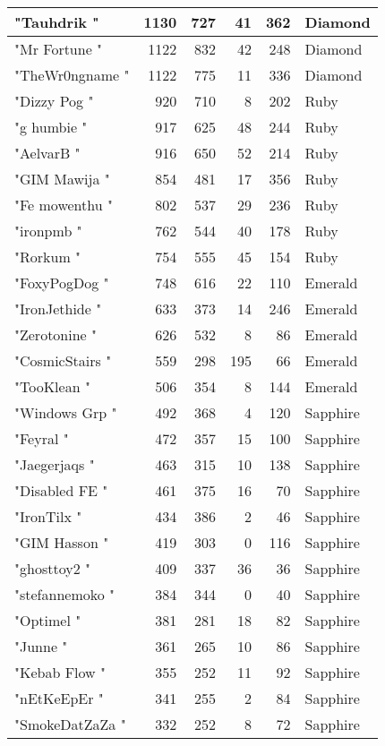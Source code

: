 \documentclass{article}
\begin{document}
\begin{table}[htbp]
\begin{tabular}{|l|r|r|r|r|l|}
"Tauhdrik " & 1130 & 727 & 41 & 362 & Diamond \\ \hline
"Mr Fortune " & 1122 & 832 & 42 & 248 & Diamond \\ \hline
"TheWr0ngname " & 1122 & 775 & 11 & 336 & Diamond \\ \hline
"Dizzy Pog " & 920 & 710 & 8 & 202 & Ruby \\ \hline
"g humbie " & 917 & 625 & 48 & 244 & Ruby \\ \hline
"AelvarB " & 916 & 650 & 52 & 214 & Ruby \\ \hline
"GIM Mawija " & 854 & 481 & 17 & 356 & Ruby \\ \hline
"Fe mowenthu " & 802 & 537 & 29 & 236 & Ruby \\ \hline
"ironpmb " & 762 & 544 & 40 & 178 & Ruby \\ \hline
"Rorkum " & 754 & 555 & 45 & 154 & Ruby \\ \hline
"FoxyPogDog " & 748 & 616 & 22 & 110 & Emerald \\ \hline
"IronJethide " & 633 & 373 & 14 & 246 & Emerald \\ \hline
"Zerotonine " & 626 & 532 & 8 & 86 & Emerald \\ \hline
"CosmicStairs " & 559 & 298 & 195 & 66 & Emerald \\ \hline
"TooKlean " & 506 & 354 & 8 & 144 & Emerald \\ \hline
"Windows Grp " & 492 & 368 & 4 & 120 & Sapphire \\ \hline
"Feyral " & 472 & 357 & 15 & 100 & Sapphire \\ \hline
"Jaegerjaqs " & 463 & 315 & 10 & 138 & Sapphire \\ \hline
"Disabled FE " & 461 & 375 & 16 & 70 & Sapphire \\ \hline
"IronTilx " & 434 & 386 & 2 & 46 & Sapphire \\ \hline
"GIM Hasson " & 419 & 303 & 0 & 116 & Sapphire \\ \hline
"ghosttoy2 " & 409 & 337 & 36 & 36 & Sapphire \\ \hline
"stefannemoko " & 384 & 344 & 0 & 40 & Sapphire \\ \hline
"Optimel " & 381 & 281 & 18 & 82 & Sapphire \\ \hline
"Junne " & 361 & 265 & 10 & 86 & Sapphire \\ \hline
"Kebab Flow " & 355 & 252 & 11 & 92 & Sapphire \\ \hline
"nEtKeEpEr " & 341 & 255 & 2 & 84 & Sapphire \\ \hline
"SmokeDatZaZa " & 332 & 252 & 8 & 72 & Sapphire \\ \hline

\end{tabular}
\end{table}
\end{document}
